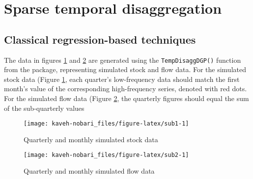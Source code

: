 \hypertarget{Sparse-temporal-disaggregation}{%
\section{Sparse temporal disaggregation}\label{Sparse-temporal-disaggregation}}

\hypertarget{Classical-regression-based-techniques}{%
\subsection{Classical regression-based techniques}\label{Classical-regression-based-techniques}}

The data in figures \ref{fig:sub1} and \ref{fig:sub2} are generated using the \texttt{TempDisaggDGP()} function from the  package, representing simulated stock and flow data. For the simulated stock data (Figure \ref{fig:sub1}, each quarter's low-frequency data should match the first month's value of the corresponding high-frequency series, denoted with red dots. For the simulated flow data (Figure \ref{fig:sub2}, the quarterly figures should equal the sum of the sub-quarterly values

\begin{figure}

{\centering \texttt{[image: kaveh-nobari\_files/figure-latex/sub1-1]} 

}

\caption{Quarterly and monthly simulated stock data}\label{fig:sub1}
\end{figure}

\begin{figure}

{\centering \texttt{[image: kaveh-nobari\_files/figure-latex/sub2-1]} 

}

\caption{Quarterly and monthly simulated flow data}\label{fig:sub2}
\end{figure}

